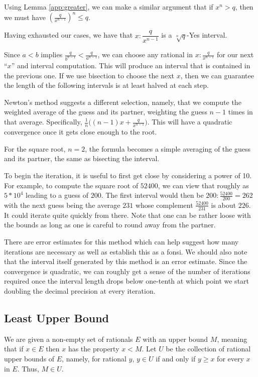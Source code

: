 \documentclass[12pt]{article}
\begin{document}
Using Lemma \ref{app:greater}, we can make a similar argument that if $x^n > q$, then we must have $(\frac{q}{x^{n-1}})^n \leq q$. 

Having exhausted our cases, we have that $x:\dfrac{q}{x^{n-1}}$ is a $\sqrt[n]{q}$-Yes interval.

Since $a<b$ implies $\frac{q}{b^{n-1}} < \frac{q}{a^{n-1}}$, we can choose any rational in $x:\frac{q}{x^{n-1}}$ for our next ``$x$'' and interval computation. This will produce an interval that is contained in the previous one. If we use bisection to choose the next $x$, then we can guarantee the length of the following intervals is at least halved at each step. 

Newton's method suggests a different selection, namely, that we compute the weighted average of the guess and its partner, weighting the guess $n-1$ times in that average. Specifically, $\frac{1}{n} \big( (n-1) x + \frac{q}{x^{n-1}} \big)$. This will have a quadratic convergence once it gets close enough to the root.

For the square root, $n=2$, the formula becomes a simple averaging of the guess and its partner, the same as bisecting the interval.  

To begin the iteration, it is useful to first get close by considering a power of 10. For example, to compute the square root of $52400$, we can view that roughly as $5*10^4$ leading to a guess of $200$. The first interval would then be $200: \frac{52400}{200} = 262$ with the next guess being the average $231$ whose complement $\frac{52400}{231}$ is about $22 6$. It could iterate quite quickly from there. Note that one can be rather loose with the bounds as long as one is careful to round away from the partner.  

There are error estimates for this method which can help suggest how many iterations are necessary as well as establish this as a fonsi. We should also note that the interval itself generated by this method is an error estimate. Since the convergence is quadratic, we can roughly get a sense of the number of iterations required once the interval length drops below one-tenth at which point we start doubling the decimal precision at every iteration.  


\subsection{Least Upper Bound}

We are given a non-empty set of rationals $E$ with an upper bound $M$, meaning that if $x \in E$ then $x$ has the property $x < M$. Let $U$ be the collection of rational upper bounds of $E$, namely, for rational $y$, $y \in U$ if and only if $y \geq x$ for every $x$ in $E$.  Thus, $M \in U$.
\end{document}

